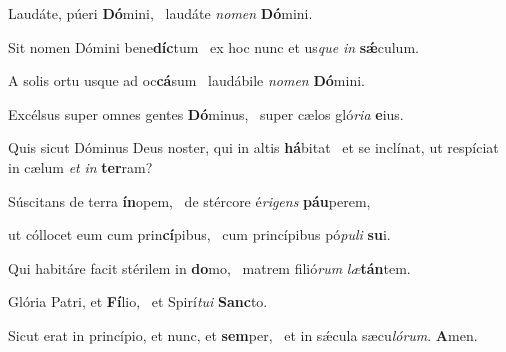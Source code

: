 \item Laudáte, púeri \textbf{Dó}mini,~\psstar{} laudáte \textit{nomen} \textbf{Dó}mini.

\item Sit nomen Dómini bene\textbf{díc}tum~\psstar{} ex hoc nunc et us\textit{que} \textit{in} \textbf{sǽ}culum.

\item A solis ortu usque ad oc\textbf{cá}sum~\psstar{} laudábile \textit{nomen} \textbf{Dó}mini.

\item Excélsus super omnes gentes \textbf{Dó}minus,~\psstar{} super cælos gló\textit{ria} \textbf{e}ius.

\item Quis sicut Dóminus Deus noster, qui in altis \textbf{há}bitat~\psstar{} et se inclínat, ut respíciat in cælum \textit{et} \textit{in} \textbf{ter}ram?

\item Súscitans de terra \textbf{ín}opem,~\psstar{} de stércore é\textit{rigens} \textbf{páu}perem,

\item ut cóllocet eum cum prin\textbf{cí}pibus,~\psstar{} cum princípibus pó\textit{puli} \textbf{su}i.

\item Qui habitáre facit stérilem in \textbf{do}mo,~\psstar{} matrem filió\textit{rum} \textit{læ}\textbf{tán}tem.

\item Glória Patri, et \textbf{Fí}lio,~\psstar{} et Spirí\textit{tui} \textbf{Sanc}to.

\item Sicut erat in princípio, et nunc, et \textbf{sem}per,~\psstar{} et in sǽcula sæcu\textit{lórum}. \textbf{A}men.